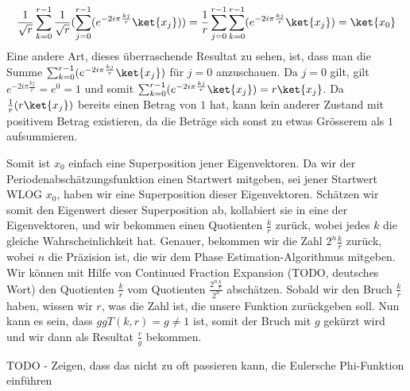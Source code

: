 \begin{align*}
    \frac{1}{\sqrt{r}}\sum_{k = 0}^{r - 1}\frac{1}{\sqrt{r}}(\sum_{j = 0}^{r - 1}(e^{-2i\pi\frac{kj}{r}}\ket{x_j})) = \frac{1}{r}\sum_{j = 0}^{r - 1}\sum_{k = 0}^{r - 1}(e^{-2i\pi\frac{kj}{r}}\ket{x_j}) = \ket{x_0}
\end{align*}
Eine andere Art, dieses überraschende Resultat zu sehen, ist, dass man die Summe $\sum_{k = 0}^{r - 1}(e^{-2i\pi\frac{kj}{r}}\ket{x_j})$ für $j = 0$ anzuschauen. Da $j = 0$ gilt, gilt $e^{-2i\pi\frac{kj}{r}} = e^{0} = 1$ und somit $\sum_{k = 0}^{r - 1}(e^{-2i\pi\frac{kj}{r}}\ket{x_j}) = r\ket{x_j}$. Da $\frac{1}{r}(r\ket{x_j})$ bereits einen Betrag von $1$ hat, kann kein anderer Zustand mit positivem Betrag existieren, da die Beträge sich sonst zu etwas Grösserem als $1$ aufsummieren.

Somit ist $x_0$ einfach eine Superposition jener Eigenvektoren. Da wir der Periodenabschätzungsfunktion einen Startwert mitgeben, sei jener Startwert WLOG $x_0$, haben wir eine Superposition dieser Eigenvektoren. Schätzen wir somit den Eigenwert dieser Superposition ab, kollabiert sie in eine der Eigenvektoren, und wir bekommen einen Quotienten $\frac{k}{r}$ zurück, wobei jedes $k$ die gleiche Wahrscheinlichkeit hat. Genauer, bekommen wir die Zahl $2^n\frac{k}{r}$ zurück, wobei $n$ die Präzision ist, die wir dem Phase Estimation-Algorithmus mitgeben. Wir können mit Hilfe von Continued Fraction Expansion (TODO, deutsches Wort) den Quotienten $\frac{k}{r}$ vom Quotienten $\frac{2^n\frac{k}{r}}{2^n}$ abschätzen. Sobald wir den Bruch $\frac{k}{r}$ haben, wissen wir $r$, was die Zahl ist, die unsere Funktion zurückgeben soll. Nun kann es sein, dass $ggT(k, r) = g \neq 1$ ist, somit der Bruch mit $g$ gekürzt wird und wir dann als Resultat $\frac{r}{g}$ bekommen. 

TODO - Zeigen, dass das nicht zu oft passieren kann, die Eulersche Phi-Funktion einführen

